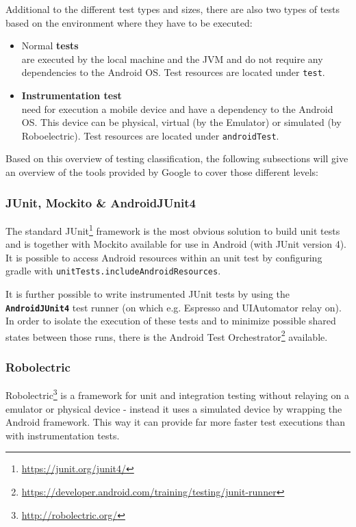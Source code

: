 Additional to the different test types and sizes, there are also two types of tests based on the environment where they have to be executed:

\begin{itemize}
	\item Normal \textbf{tests}\\
	are executed by the local machine and the JVM and do not require any dependencies to the Android OS. Test resources are located under \texttt{test}.
	\item \textbf{Instrumentation test} \\
	need for execution a mobile device and have a dependency to the Android OS. This device can be physical, virtual (by the Emulator) or simulated (by Roboelectric). Test resources are located under \texttt{androidTest}.
\end{itemize}

Based on this overview of testing classification, the following subsections will give an overview of the tools provided by Google to cover those different levels:

\subsubsection{JUnit, Mockito \& AndroidJUnit4}
The standard JUnit\footnote{\url{https://junit.org/junit4/}} framework is the most obvious solution to build unit tests and is together with Mockito available for use in Android (with JUnit version 4). It is possible to access Android resources within an unit test by configuring gradle with \texttt{unitTests.includeAndroidResources}.

It is further possible to write instrumented JUnit tests by using the \textbf{\texttt{AndroidJUnit4}} test runner (on which e.g. Espresso and UIAutomator relay on). In order to isolate the execution of these tests and to minimize possible shared states between those runs, there is the Android Test Orchestrator\footnote{\url{https://developer.android.com/training/testing/junit-runner}} available.

\subsubsection{Robolectric}
Robolectric\footnote{\url{http://robolectric.org/}} is a framework for unit and integration testing without relaying on a emulator or physical device - instead it uses a simulated device by wrapping the Android framework. This way it can provide far more faster test executions than with instrumentation tests.

